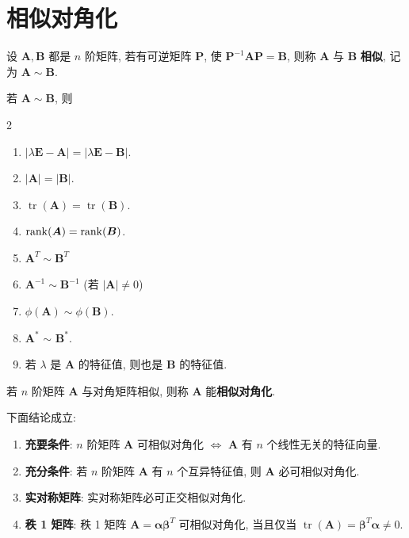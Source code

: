 \documentclass[12pt, a4paper, oneside, UTF8]{ctexbook}
\begin{document}
\section{相似对角化}
\begin{definition}
	设 $\bm{A}, \bm{B}$ 都是 $n$ 阶矩阵, 若有可逆矩阵 $\bm{P}$, 使 $\bm{P}^{-1}\bm{A}\bm{P}=\bm{B}$, 则称 $\bm{A}$ 与 $\bm{B}$ \textbf{相似}, 记为 $\bm{A} \sim \bm{B}$.
\end{definition}
\begin{theorem}
	若 $\bm{A} \sim \bm{B}$, 则
	\begin{multicols}{2}
		\begin{enumerate}
			\item $|\lambda \bm{E} - \bm{A}| = |\lambda \bm{E} - \bm{B}|$.
			\item $|\bm{A}| = |\bm{B}|$.
			\item $\operatorname{tr}(\bm{A}) = \operatorname{tr}(\bm{B})$.
			\item $\mathrm{rank}(\bm{A}) = \mathrm{rank}(\bm{B})$.
			\item $\bm{A}^T \sim \bm{B}^T$
			\item $\bm{A}^{-1} \sim \bm{B}^{-1}$ (若 $|\bm{A}| \neq 0$)
			\item $\phi(\bm{A}) \sim \phi(\bm{B})$.
			\item $\bm{A}^*$ $\sim$ $\bm{B}^*$.
			\item 若 $\lambda$ 是 $\bm{A}$ 的特征值, 则也是 $\bm{B}$ 的特征值.
		\end{enumerate}
	\end{multicols}
\end{theorem}
\begin{definition}
	若 $n$ 阶矩阵 $\bm{A}$ 与对角矩阵相似, 则称 $\bm{A}$ 能\textbf{相似对角化}.
\end{definition}
\begin{theorem}[相似对角化的条件]
    下面结论成立:
	\begin{enumerate}
		\item \textbf{充要条件}: $n$ 阶矩阵 $\bm{A}$ 可相似对角化 $\iff$ $\bm{A}$ 有 $n$ 个线性无关的特征向量.
		\item \textbf{充分条件}: 若 $n$ 阶矩阵 $\bm{A}$ 有 $n$ 个互异特征值, 则 $\bm{A}$ 必可相似对角化.
		\item \textbf{实对称矩阵}: 实对称矩阵必可正交相似对角化.
		\item \textbf{秩 1 矩阵}: 秩 1 矩阵 $\bm{A}=\bm{\alpha}\bm{\beta}^T$ 可相似对角化, 当且仅当 $\operatorname{tr}(\bm{A})=\bm{\beta}^T\bm{\alpha} \neq 0$.
	\end{enumerate}
\end{theorem}
\end{document}

